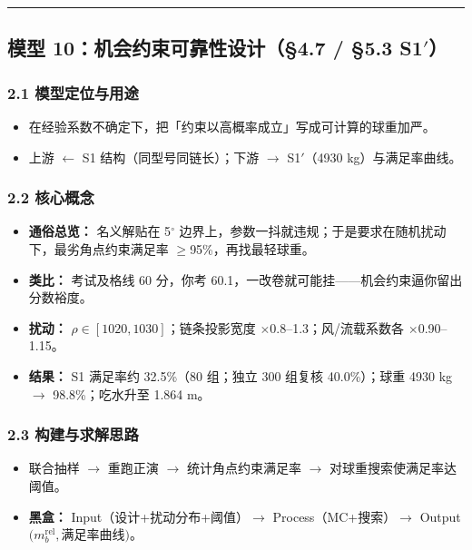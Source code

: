 \documentclass[UTF8,a4paper,zihao=-4]{ctexart}
\begin{document}
\vspace{0.4em}\hrule\vspace{0.4em}

\subsection{\texorpdfstring{模型 10：机会约束可靠性设计（§4.7 / §5.3 S1$'$）}{模型 10：机会约束可靠性设计（§4.7 / §5.3 S1$'$）}}

\subsubsection{\texorpdfstring{2.1 模型定位与用途}{2.1 模型定位与用途}}
\begin{itemize}[leftmargin=1.5em]
\item 在经验系数不确定下，把「约束以高概率成立」写成可计算的球重加严。
\item 上游 $\leftarrow$ S1 结构（同型号同链长）；下游 $\rightarrow$ S1$'$（4930 kg）与满足率曲线。
\end{itemize}

\subsubsection{\texorpdfstring{2.2 核心概念}{2.2 核心概念}}
\begin{itemize}[leftmargin=1.5em]
\item \textbf{通俗总览：} 名义解贴在 5$^\circ$ 边界上，参数一抖就违规；于是要求在随机扰动下，最劣角点约束满足率 $\ge$95\%，再找最轻球重。
\item \textbf{类比：} 考试及格线 60 分，你考 60.1，一改卷就可能挂------机会约束逼你留出分数裕度。
\item \textbf{扰动：} \(\rho\in[1020,1030]\)；链条投影宽度 $\times$0.8--1.3；风/流载系数各 $\times$0.90--1.15。
\item \textbf{结果：} S1 满足率约 32.5\%（80 组；独立 300 组复核 40.0\%）；球重 4930 kg $\rightarrow$ 98.8\%；吃水升至 1.864 m。
\end{itemize}

\subsubsection{\texorpdfstring{2.3 构建与求解思路}{2.3 构建与求解思路}}
\begin{itemize}[leftmargin=1.5em]
\item 联合抽样 $\rightarrow$ 重跑正演 $\rightarrow$ 统计角点约束满足率 $\rightarrow$ 对球重搜索使满足率达阈值。
\item \textbf{黑盒：} Input（设计+扰动分布+阈值）$\rightarrow$ Process（MC+搜索）$\rightarrow$ Output\((m_b^{\mathrm{rel}},\)满足率曲线\()\)。
\end{itemize}
\end{document}
